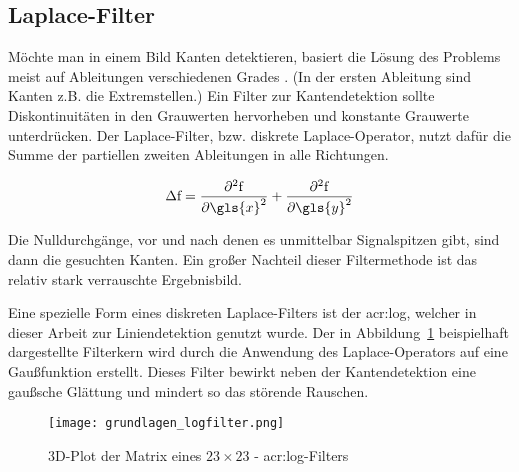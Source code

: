 \subsection{Laplace-Filter} \label{ssec:laplaceFilter}

Möchte man in einem Bild Kanten detektieren, basiert die Lösung des Problems meist auf Ableitungen verschiedenen Grades \autocite[S.~360ff]{jaehneDigitaleBildverarbeitungMit2005}. (In der ersten Ableitung sind Kanten z.B. die Extremstellen.) Ein Filter zur Kantendetektion sollte Diskontinuitäten in den Grauwerten hervorheben und konstante Grauwerte unterdrücken. Der Laplace-Filter, bzw. diskrete Laplace-Operator, nutzt dafür die Summe der partiellen zweiten Ableitungen in alle Richtungen. \autocite[S.~90]{papulaMathematikFuerIngenieure2016}

\begin{equation}
\Delta \mathrm{f} = \frac{\partial^2 \mathrm{f}}{\partial {\gls{x}}^2} + \frac{\partial^2 \mathrm{f}}{\partial {\gls{y}}^2}
\end{equation}

Die Nulldurchgänge, vor und nach denen es unmittelbar Signalspitzen gibt, sind dann die gesuchten Kanten. Ein großer Nachteil dieser Filtermethode ist das relativ stark verrauschte Ergebnisbild.

Eine spezielle Form eines diskreten Laplace-Filters ist der \gls{acr:log}, welcher in dieser Arbeit zur Liniendetektion genutzt wurde. Der in Abbildung~\ref{fig:grundlagen_logfilter} beispielhaft dargestellte Filterkern wird durch die Anwendung des Laplace-Operators auf eine Gaußfunktion erstellt. Dieses Filter bewirkt neben der Kantendetektion eine gaußsche Glättung und mindert so das störende Rauschen.

\begin{figure}[h] %
  \centering
  \texttt{[image: grundlagen\_logfilter.png]}
  \caption{3D-Plot der Matrix eines \( 23\times23\) - \gls{acr:log}-Filters}
  \label{fig:grundlagen_logfilter}
\end{figure}  

